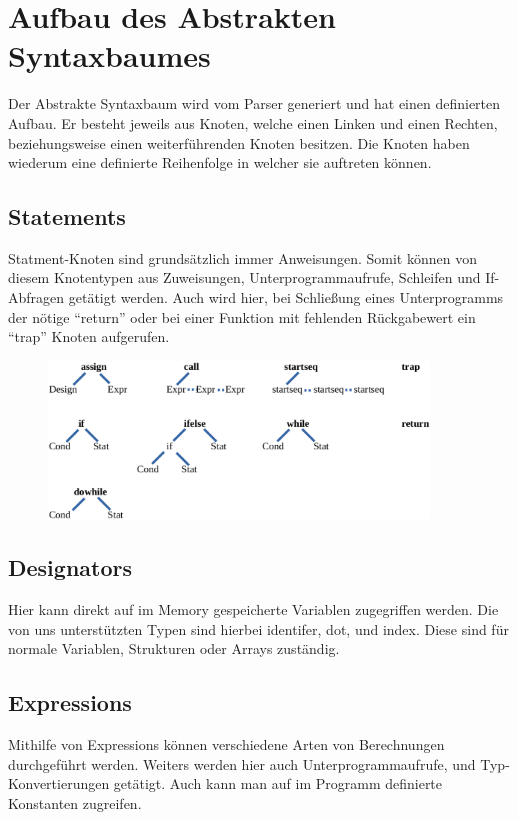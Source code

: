 \section{Aufbau des Abstrakten Syntaxbaumes}
\label{sec:interpr-ast}
Der Abstrakte Syntaxbaum wird vom Parser generiert und hat einen definierten Aufbau. Er besteht jeweils aus Knoten, welche einen Linken und einen Rechten, beziehungsweise einen weiterführenden Knoten besitzen. Die Knoten haben wiederum eine definierte Reihenfolge in welcher sie auftreten können. 

\subsection{Statements}
Statment-Knoten sind grundsätzlich immer Anweisungen. Somit können von diesem Knotentypen aus Zuweisungen, Unterprogrammaufrufe, Schleifen und If- Abfragen getätigt werden. Auch wird hier, bei Schließung eines Unterprogramms der nötige "`return"' oder bei einer Funktion mit fehlenden Rückgabewert ein "`trap"' Knoten aufgerufen.

\begin{figure}[h] 
  \centering
     \includegraphics[width=0.9\textwidth]{./media/images/interpreter/statements.png}
  \label{fig:Statements}
\end{figure}


\subsection{Designators}
Hier kann direkt auf im Memory gespeicherte Variablen zugegriffen werden. Die von uns unterstützten Typen sind hierbei identifer, dot, und index. Diese sind für normale Variablen, Strukturen oder Arrays zuständig.

\subsection{Expressions}
Mithilfe von Expressions können verschiedene Arten von Berechnungen durchgeführt werden. Weiters werden hier auch Unterprogrammaufrufe, und Typ-Konvertierungen getätigt. Auch kann man auf im Programm definierte Konstanten zugreifen.

